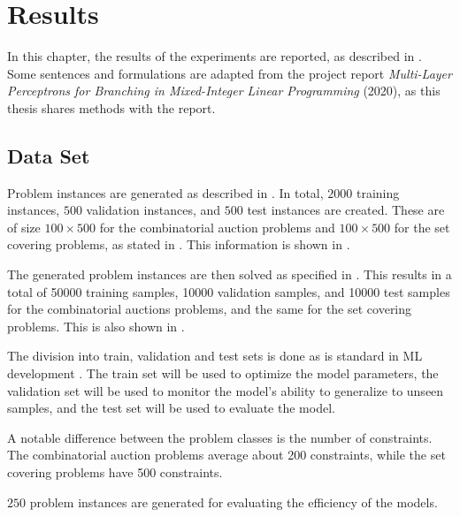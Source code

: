 \chapter{Results}\label{cha:results}

In this chapter, the results of the experiments are reported, as described in . Some sentences and formulations are adapted from the project report \textit{Multi-Layer Perceptrons for Branching in Mixed-Integer Linear Programming} (2020), as this thesis shares methods with the report. 


\section{Data Set}\label{sec:datagen}

Problem instances are generated as described in . In total, $2000$ training instances, $500$ validation instances, and $ 500 $ test instances are created. These are of size $100 \times 500$ for the combinatorial auction problems and $100 \times 500$ for the set covering problems, as stated in . This information is shown in .

The generated problem instances are then solved as specified in . This results in a total of 50000 training samples, 10000 validation samples, and 10000 test samples for the combinatorial auctions problems, and the same for the set covering problems. This is also shown in .

The division into train, validation and test sets is done as is standard in \gls{ML} development \cite{goodfellow2016deep}. The train set will be used to optimize the model parameters, the validation set will be used to monitor the model's ability to generalize to unseen samples, and the test set will be used to evaluate the model. 

A notable difference between the problem classes is the number of constraints. The combinatorial auction problems average about 200 constraints, while the set covering problems have 500 constraints.  

$250$ problem instances are generated for evaluating the efficiency of the models. %

